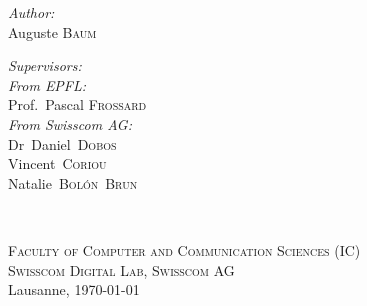 \begin{titlepage}
\begin{center}
    \begin{minipage}[t]{0.4\textwidth}
    \begin{flushleft} \large
    \emph{Author:}\\
    Auguste \textsc{Baum}
    \end{flushleft}
    \end{minipage}
    \begin{minipage}[t]{0.4\textwidth}
    \begin{flushright} \large
    \emph{Supervisors:} \\
    [0.5cm]
    \emph{From EPFL:}\\
    Prof.~Pascal \textsc{Frossard}\\
    [0.2cm]
    \emph{From Swisscom AG:}\\
Dr~Daniel~\textsc{Dobos}\\
Vincent~\textsc{Coriou}\\
Natalie~\textsc{Bol\'on~Brun}
    \end{flushright}
    \end{minipage}\\[3cm]
     
    \vfill
    
    \small{\textsc{Faculty of Computer and Communication Sciences (IC)}}\\
    \small{\textsc{Swisscom Digital Lab, Swisscom AG}}\\
    [1cm]
    
    {\large Lausanne, \today}\\[2cm] %
     
    \end{center}
\end{titlepage}